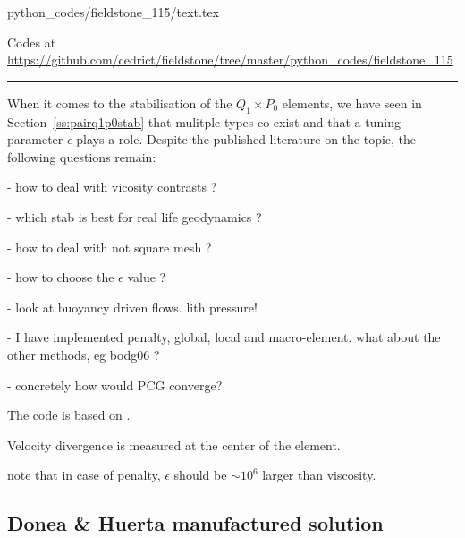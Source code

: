 \begin{flushright} {\tiny {\color{gray} python\_codes/fieldstone\_115/text.tex}} \end{flushright}



\begin{center}
Codes at \url{https://github.com/cedrict/fieldstone/tree/master/python_codes/fieldstone_115}
\end{center}

\par\noindent\rule{\textwidth}{0.4pt}




When it comes to the stabilisation of the $Q_1\times P_0$ elements, 
we have seen in Section~\ref{ss:pairq1p0stab} that mulitple types co-exist
and that a tuning parameter $\epsilon$ plays a role. 
Despite the published literature on the topic, the following questions remain:

- how to deal with vicosity contrasts ? 

- which stab is best for real life geodynamics ? 

- how to deal with not square mesh ?

- how to choose the $\epsilon$ value ?

- look at buoyancy driven flows. lith pressure!

- I have implemented penalty, global, local and macro-element. what about the other methods, eg bodg06 ?

- concretely how would PCG converge?

The code is based on .

Velocity divergence is measured at the center of the element.

note that in case of penalty, $\epsilon$ should be $\sim 10^6$ larger than viscosity.

\subsection*{Donea \& Huerta manufactured solution}



